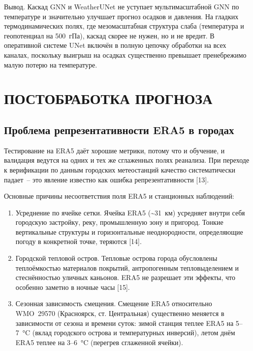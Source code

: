 \documentclass[14pt,a4paper]{extarticle}
\numberwithin{table}{section}
\numberwithin{figure}{section}
\numberwithin{equation}{section}
\providecommand{\tightlist}{%
  \setlength{\itemsep}{0pt}\setlength{\parskip}{0pt}}
\begin{document}
Вывод. Каскад GNN и WeatherUNet не уступает мультимасштабной
GNN по температуре и значительно улучшает прогноз осадков и
давления. На гладких термодинамических полях, где мезомасштабная
структура слаба (температура и геопотенциал на 500~гПа), каскад
скорее не нужен, но и не вредит. В оперативной системе UNet
включён в полную цепочку обработки на всех каналах, поскольку выигрыш на осадках
существенно превышает пренебрежимо малую потерю на температуре.


\newpage

\section{ПОСТОБРАБОТКА ПРОГНОЗА}\label{ux43fux43eux441ux442ux43fux440ux43eux446ux435ux441ux441ux438ux43dux433-ux43fux440ux43eux433ux43dux43eux437ux430}

\subsection{Проблема репрезентативности ERA5 в городах}\label{ux43fux440ux43eux431ux43bux435ux43cux430-ux440ux435ux43fux440ux435ux437ux435ux43dux442ux430ux442ux438ux432ux43dux43eux441ux442ux438-era5-ux432-ux433ux43eux440ux43eux434ux430ux445}

Тестирование на ERA5 даёт хорошие метрики, потому что и обучение,
и валидация ведутся на одних и тех же сглаженных полях реанализа.
При переходе к верификации по данным городских метеостанций качество
систематически падает~-- это явление известно как ошибка
репрезентативности {[}13{]}.

Основные причины несоответствия поля ERA5 и станционных наблюдений:

\begin{enumerate}
\def\labelenumi{\arabic{enumi}.}
\tightlist
\item
  Усреднение по ячейке сетки. Ячейка ERA5 (\textasciitilde31~км)
  усредняет внутри себя городскую застройку, реку, промышленную зону и
  пригород. Тонкие вертикальные структуры и горизонтальные
  неоднородности, определяющие погоду в конкретной точке, теряются
  {[}14{]}.
\item
  Городской тепловой остров. Тепловые острова города обусловлены
  теплоёмкостью материалов покрытий, антропогенным тепловыделением и
  стеснённостью уличных каньонов. ERA5 не разрешает эти эффекты,
  что особенно заметно в ночные часы {[}15{]}.
\item
  Сезонная зависимость смещения. Смещение ERA5 относительно WMO~29570
  (Красноярск, ст. Центральная) существенно меняется в зависимости от
  сезона и времени суток: зимой станция теплее ERA5 на 5--7~°C (вклад
  городского острова и температурных инверсий), летом днём ERA5 теплее
  на 3--6~°C (перегрев сглаженной ячейки).
\end{enumerate}
\end{document}
